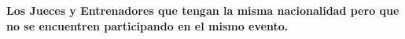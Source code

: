 \textbf{Los Jueces y Entrenadores que tengan la misma nacionalidad pero que no se encuentren participando en
el mismo evento.}\vspace{.3cm}